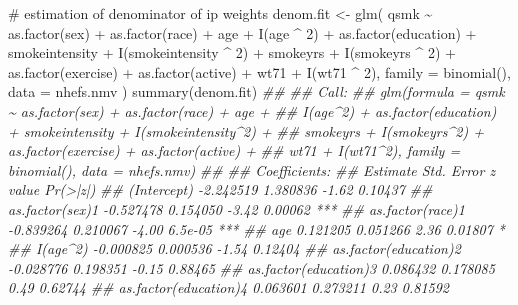 \documentclass[
  10pt,
  a4paper,
]{book}
\newenvironment{Shaded}{\begin{snugshade}}{\end{snugshade}}
\newcommand{\AttributeTok}[1]{\textcolor[rgb]{0.40,0.45,0.13}{#1}}
\newcommand{\CommentTok}[1]{\textcolor[rgb]{0.37,0.37,0.37}{#1}}
\newcommand{\DecValTok}[1]{\textcolor[rgb]{0.68,0.00,0.00}{#1}}
\newcommand{\DocumentationTok}[1]{\textcolor[rgb]{0.37,0.37,0.37}{\textit{#1}}}
\newcommand{\FunctionTok}[1]{\textcolor[rgb]{0.28,0.35,0.67}{#1}}
\newcommand{\NormalTok}[1]{\textcolor[rgb]{0.00,0.46,0.62}{#1}}
\newcommand{\OtherTok}[1]{\textcolor[rgb]{0.00,0.46,0.62}{#1}}
\newcommand{\SpecialCharTok}[1]{\textcolor[rgb]{0.37,0.37,0.37}{#1}}
\begin{document}
\begin{Shaded}
\begin{Highlighting}[]
\CommentTok{\# estimation of denominator of ip weights}
\NormalTok{denom.fit }\OtherTok{\textless{}{-}}
  \FunctionTok{glm}\NormalTok{(}
\NormalTok{    qsmk }\SpecialCharTok{\textasciitilde{}} \FunctionTok{as.factor}\NormalTok{(sex) }\SpecialCharTok{+} \FunctionTok{as.factor}\NormalTok{(race) }\SpecialCharTok{+}\NormalTok{ age }\SpecialCharTok{+} \FunctionTok{I}\NormalTok{(age }\SpecialCharTok{\^{}} \DecValTok{2}\NormalTok{) }\SpecialCharTok{+}
      \FunctionTok{as.factor}\NormalTok{(education) }\SpecialCharTok{+}\NormalTok{ smokeintensity }\SpecialCharTok{+}
      \FunctionTok{I}\NormalTok{(smokeintensity }\SpecialCharTok{\^{}} \DecValTok{2}\NormalTok{) }\SpecialCharTok{+}\NormalTok{ smokeyrs }\SpecialCharTok{+} \FunctionTok{I}\NormalTok{(smokeyrs }\SpecialCharTok{\^{}} \DecValTok{2}\NormalTok{) }\SpecialCharTok{+}
      \FunctionTok{as.factor}\NormalTok{(exercise) }\SpecialCharTok{+} \FunctionTok{as.factor}\NormalTok{(active) }\SpecialCharTok{+}\NormalTok{ wt71 }\SpecialCharTok{+} \FunctionTok{I}\NormalTok{(wt71 }\SpecialCharTok{\^{}} \DecValTok{2}\NormalTok{),}
    \AttributeTok{family =} \FunctionTok{binomial}\NormalTok{(),}
    \AttributeTok{data =}\NormalTok{ nhefs.nmv}
\NormalTok{  )}
\FunctionTok{summary}\NormalTok{(denom.fit)}
\DocumentationTok{\#\# }
\DocumentationTok{\#\# Call:}
\DocumentationTok{\#\# glm(formula = qsmk \textasciitilde{} as.factor(sex) + as.factor(race) + age + }
\DocumentationTok{\#\#     I(age\^{}2) + as.factor(education) + smokeintensity + I(smokeintensity\^{}2) + }
\DocumentationTok{\#\#     smokeyrs + I(smokeyrs\^{}2) + as.factor(exercise) + as.factor(active) + }
\DocumentationTok{\#\#     wt71 + I(wt71\^{}2), family = binomial(), data = nhefs.nmv)}
\DocumentationTok{\#\# }
\DocumentationTok{\#\# Coefficients:}
\DocumentationTok{\#\#                        Estimate Std. Error z value Pr(\textgreater{}|z|)    }
\DocumentationTok{\#\# (Intercept)           {-}2.242519   1.380836   {-}1.62  0.10437    }
\DocumentationTok{\#\# as.factor(sex)1       {-}0.527478   0.154050   {-}3.42  0.00062 ***}
\DocumentationTok{\#\# as.factor(race)1      {-}0.839264   0.210067   {-}4.00  6.5e{-}05 ***}
\DocumentationTok{\#\# age                    0.121205   0.051266    2.36  0.01807 *  }
\DocumentationTok{\#\# I(age\^{}2)              {-}0.000825   0.000536   {-}1.54  0.12404    }
\DocumentationTok{\#\# as.factor(education)2 {-}0.028776   0.198351   {-}0.15  0.88465    }
\DocumentationTok{\#\# as.factor(education)3  0.086432   0.178085    0.49  0.62744    }
\DocumentationTok{\#\# as.factor(education)4  0.063601   0.273211    0.23  0.81592    }

\end{Highlighting}
\end{Shaded}
\end{document}
